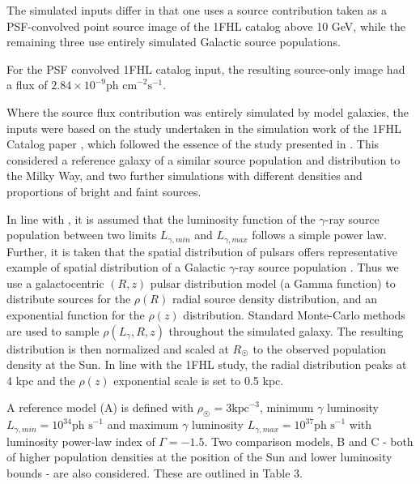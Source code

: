 \documentclass{PoS}
\begin{document}
The simulated inputs differ in that one uses a source contribution taken as a PSF-convolved point source image of the 1FHL catalog above 10 GeV, while the remaining three use entirely simulated Galactic source populations.

For the PSF convolved 1FHL catalog input, the resulting source-only image had a flux of $2.84\times 10^{-9} \text{ph cm}^{-2}\text{s}^{-1}$.

Where the source flux contribution was entirely simulated by model galaxies, the inputs were based on the study undertaken in the simulation work of the 1FHL Catalog paper \cite[p.59]{1fhl}, which followed the essence of the study presented in \cite{Strong}. This considered a reference galaxy of a similar source population and distribution to the Milky Way, and two further simulations with different densities and proportions of bright and faint sources.

In line with \cite{Strong}, it is assumed that the luminosity function of the $\gamma$-ray source population between two limits $L_{\gamma, min}$ and $L_{\gamma, max}$ follows a simple power law. Further, it is taken that the spatial distribution of pulsars offers representative example of spatial distribution of a Galactic $\gamma$-ray source population \cite[p.2]{Strong}. Thus we use a galactocentric $(R, z)$ pulsar distribution model \cite[p.7]{Lorimer} (a Gamma function) to distribute sources for the $\rho(R)$ radial source density distribution, and an exponential function for the $\rho(z)$ distribution. Standard Monte-Carlo methods are used to sample $\rho(L_{\gamma}, R, z)$ throughout the simulated galaxy. The resulting distribution is then normalized and scaled at $R_{\astrosun}$ to the observed population density at the Sun. In line with the 1FHL study, the radial distribution peaks at 4 kpc and the $\rho(z)$ exponential scale is set to 0.5 kpc.

A reference model (A) is defined with $\rho_{\astrosun} = 3 \text{kpc}^{-3}$, minimum $\gamma$ luminosity $L_{\gamma, min} = 10^{34} \text{ph s}^{-1}$ and maximum $\gamma$ luminosity $L_{\gamma, max} = 10^{37} \text{ph s}^{-1}$ with luminosity power-law index of $\Gamma=-1.5$. Two comparison models, B and C - both of higher population densities at the position of the Sun and lower luminosity bounds - are also considered. These are outlined in Table 3.

\begin{table}
\centering
{}
\caption{Parameters for 10 - 500 GeV Galaxy Population Simulations.}
\end{table}
\end{document}

